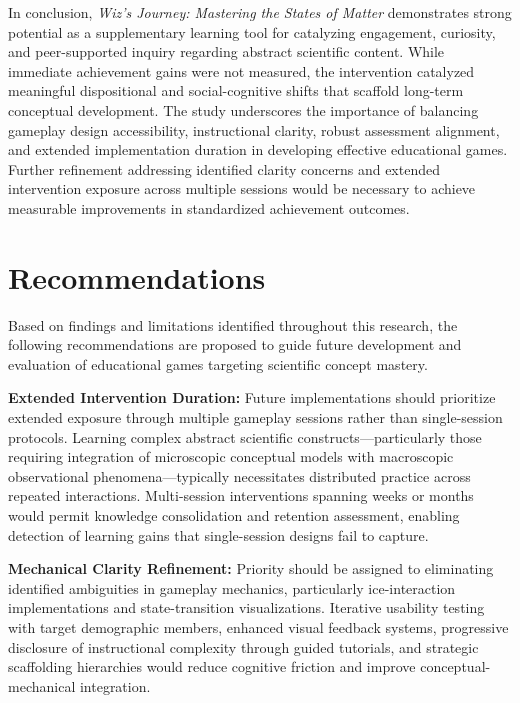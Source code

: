 In conclusion, \textit{Wiz's Journey: Mastering the States of Matter} demonstrates strong potential as a supplementary learning tool for catalyzing engagement, curiosity, and peer-supported inquiry regarding abstract scientific content. While immediate achievement gains were not measured, the intervention catalyzed meaningful dispositional and social-cognitive shifts that scaffold long-term conceptual development. The study underscores the importance of balancing gameplay design accessibility, instructional clarity, robust assessment alignment, and extended implementation duration in developing effective educational games. Further refinement addressing identified clarity concerns and extended intervention exposure across multiple sessions would be necessary to achieve measurable improvements in standardized achievement outcomes.

\section{Recommendations}

Based on findings and limitations identified throughout this research, the following recommendations are proposed to guide future development and evaluation of educational games targeting scientific concept mastery.

\textbf{Extended Intervention Duration:} Future implementations should prioritize extended exposure through multiple gameplay sessions rather than single-session protocols. Learning complex abstract scientific constructs---particularly those requiring integration of microscopic conceptual models with macroscopic observational phenomena---typically necessitates distributed practice across repeated interactions. Multi-session interventions spanning weeks or months would permit knowledge consolidation and retention assessment, enabling detection of learning gains that single-session designs fail to capture.

\textbf{Mechanical Clarity Refinement:} Priority should be assigned to eliminating identified ambiguities in gameplay mechanics, particularly ice-interaction implementations and state-transition visualizations. Iterative usability testing with target demographic members, enhanced visual feedback systems, progressive disclosure of instructional complexity through guided tutorials, and strategic scaffolding hierarchies would reduce cognitive friction and improve conceptual-mechanical integration.


